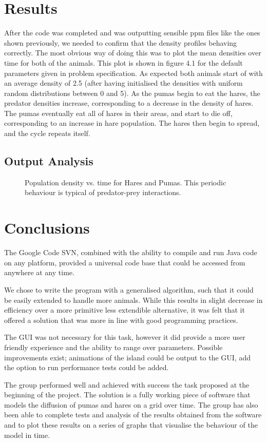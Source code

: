 \documentclass[11pt]{report}
\begin{document}
\chapter{Results}
After the code was completed and was outputting sensible ppm files like the ones shown previously, we needed to confirm that the density profiles behaving correctly. The most obvious way of doing this was to plot the mean densities over time for both of the animals. This plot is shown in figure 4.1 for the default parameters given in problem specification. As expected both animals start of with an average density of 2.5 (after having initialised the densities with uniform random distributions between 0 and 5). As the pumas begin to eat the hares, the predator densities increase, corresponding to a decrease in the density of hares.
The pumas eventually eat all of hares in their areas, and start to die off, corresponding to an increase in hare population. The hares then begin to spread, and the cycle repeats itself.

	\section{Output Analysis}
	\begin{figure}[H]
   
   
   \caption{Population density vs. time for Hares and Pumas. This periodic behaviour is typical of predator-prey interactions.}
   \end{figure}



\chapter{Conclusions} %

	The Google Code SVN, combined with the ability to compile and run Java code on any platform, provided a universal code base that could be accessed from anywhere at any time.  
	
We chose to write the program with a generalised algorithm, such that it could be easily extended to handle more animals. While this results in slight decrease in efficiency over a more primitive less extendible alternative, it was felt that it offered a solution that was more in line with good programming practices.

The GUI was not necessary for this task, however it did provide a more user friendly experience and the ability to range over parameters. Possible improvements exist; animations of the island could be output to the GUI, add the option to run performance tests could be added.
  
The group performed well and achieved with success the task proposed at the beginning of the project. The solution is a fully working piece of software that models the diffusion of pumas and hares on a grid over time. The group has also been able to complete tests and analysis of the results obtained from the software and to plot these results on a series of graphs that visualise the behaviour of the model in time.
\end{document}
